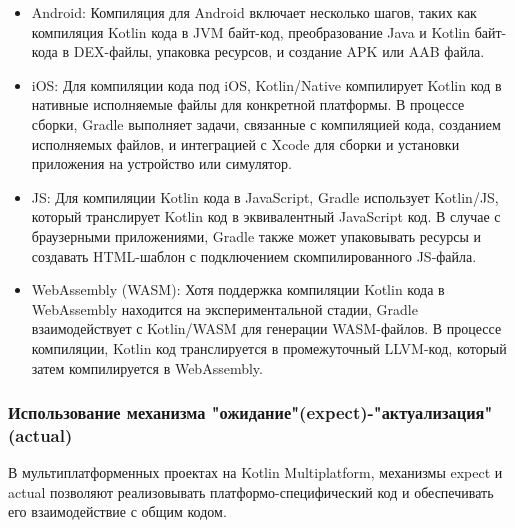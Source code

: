 \documentclass[14pt, russian]{scrartcl}
\begin{document}
\begin{itemize}
    \item Android: Компиляция для Android включает несколько шагов, таких как компиляция Kotlin кода в JVM байт-код, преобразование Java и Kotlin байт-кода в DEX-файлы, упаковка ресурсов, и создание APK или AAB файла.
    \item iOS: Для компиляции кода под iOS, Kotlin/Native компилирует Kotlin код в нативные исполняемые файлы для конкретной платформы. В процессе сборки, Gradle выполняет задачи, связанные с компиляцией кода, созданием исполняемых файлов, и интеграцией с Xcode для сборки и установки приложения на устройство или симулятор.
    \item JS: Для компиляции Kotlin кода в JavaScript, Gradle использует Kotlin/JS, который транслирует Kotlin код в эквивалентный JavaScript код. В случае с браузерными приложениями, Gradle также может упаковывать ресурсы и создавать HTML-шаблон с подключением скомпилированного JS-файла.
    \item WebAssembly (WASM): Хотя поддержка компиляции Kotlin кода в WebAssembly находится на экспериментальной стадии, Gradle взаимодействует с Kotlin/WASM для генерации WASM-файлов. В процессе компиляции, Kotlin код транслируется в промежуточный LLVM-код, который затем компилируется в WebAssembly.
\end{itemize}

\subsubsection{Использование механизма "ожидание"(expect)-"актуализация"(actual)}

В мультиплатформенных проектах на Kotlin Multiplatform, механизмы expect и actual позволяют реализовывать платформо-специфический код и обеспечивать его взаимодействие с общим кодом.~\cite{KotlinExpectActual}
\end{document}
